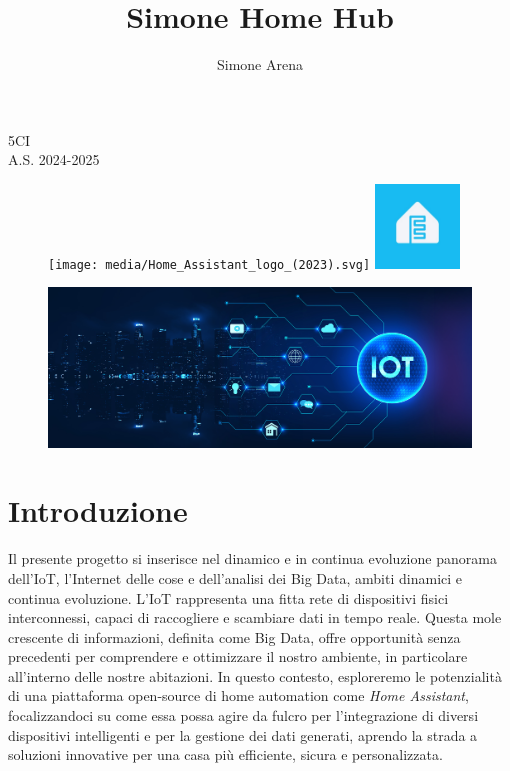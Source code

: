 \documentclass[11pt, a4paper]{article}
\title{Simone Home Hub}
\author{Simone Arena}
\date{}
\begin{document}
\color{black}

\maketitle

\begin{center}
    5CI\\
    A.S. 2024-2025
\end{center}

\begin{figure}[h!]
    \centering
    \texttt{[image: media/Home\_Assistant\_logo\_(2023).svg]}
    \hspace{1cm} %
    \includegraphics[width=0.2\textwidth]{media/esphome-logo.jpeg}
    \label{fig:logos}
\end{figure}

\newpage

\tableofcontents

\newpage

\begin{figure}[h!]
    \centering
    \includegraphics[width=1\textwidth]{media/iot-banner.jpg}
    \label{fig:iot-banner}
\end{figure}
\section{Introduzione}
Il presente progetto si inserisce nel dinamico 
e in continua evoluzione panorama dell'IoT, l'Internet delle cose
 e dell'analisi dei Big Data, ambiti dinamici e continua evoluzione. 
L'IoT rappresenta una fitta rete di dispositivi 
fisici interconnessi, capaci di raccogliere e 
scambiare dati in tempo reale. Questa mole crescente 
di informazioni, definita come Big Data, offre opportunità 
senza precedenti per comprendere e ottimizzare il nostro ambiente, 
in particolare all'interno delle nostre abitazioni. 
In questo contesto, esploreremo le potenzialità di una 
piattaforma open-source di home automation come \textit{Home Assistant}, 
focalizzandoci su come essa possa agire da fulcro per l'integrazione 
di diversi dispositivi intelligenti e per la gestione dei dati generati, 
aprendo la strada a soluzioni innovative per una casa più efficiente, 
sicura e personalizzata.
\end{document}
